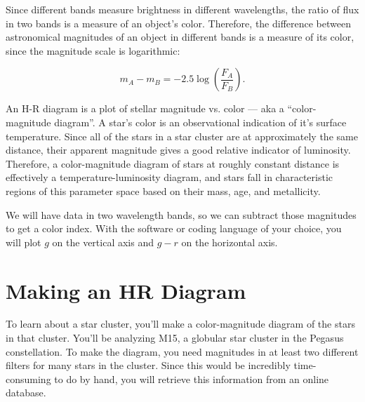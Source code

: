 
Since different bands measure brightness in different wavelengths, the ratio of flux in two bands is a measure of an object's color. Therefore, the difference between astronomical magnitudes of an object in different bands is a measure of its color, since the magnitude scale is logarithmic:

\begin{equation}
m_A - m_B = -2.5\log\left(\frac{F_A}{F_B}\right).
\end{equation}

An H-R diagram is a plot of stellar magnitude vs. color --- aka a ``color-magnitude diagram''. A star's color is an observational indication of it's surface temperature. Since all of the stars in a star cluster are at approximately the same distance, their apparent magnitude gives a good relative indicator of luminosity. Therefore, a color-magnitude diagram of stars at roughly constant distance is effectively a temperature-luminosity diagram, and stars fall in characteristic regions of this parameter space based on their mass, age, and metallicity.

We will have data in two wavelength bands, so we can subtract those magnitudes to get a color index. With the software or coding language of your choice, you will plot $g$ on the vertical axis and $g - r$ on the horizontal axis.

\section{Making an HR Diagram}

To learn about a star cluster, you'll make a color-magnitude diagram of the stars in that cluster. You'll be analyzing M15, a globular star cluster in the Pegasus constellation. To make the diagram, you need magnitudes in at least two different filters for many stars in the cluster. Since this would be incredibly time-consuming to do by hand, you will retrieve this information from an online database.

